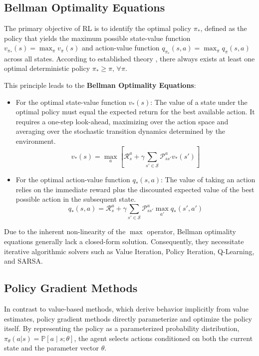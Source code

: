 \documentclass[a4paper]{scrartcl}
\begin{document}
\subsection{Bellman Optimality Equations}
The primary objective of RL is to identify the optimal policy $\pi_*$, defined as the policy that yields the maximum possible state-value function $v_{\pi_*}(s) = \max_\pi v_\pi(s)$ and action-value function $q_{\pi_*}(s,a) = \max_\pi q_\pi(s,a)$ across all states. According to established theory \cite{SuttonBarto2018}, there always exists at least one optimal deterministic policy $\pi_* \geq \pi, \, \forall \pi$.

This principle leads to the \textbf{Bellman Optimality Equations}:
\begin{itemize}
    \item For the optimal state-value function $v_*(s)$: The value of a state under the optimal policy must equal the expected return for the best available action. It requires a one-step look-ahead, maximizing over the action space and averaging over the stochastic transition dynamics determined by the environment.
    \begin{equation}
    v_*(s) = \max_{a} \left[ \mathcal{R}_s^a + \gamma \sum_{s' \in \mathcal{S}} \mathcal{P}_{ss'}^a v_*(s') \right]
    \end{equation}
    
    \item For the optimal action-value function $q_*(s,a)$: The value of taking an action relies on the immediate reward plus the discounted expected value of the best possible action in the subsequent state.
    \begin{equation}
    q_*(s,a) = \mathcal{R}_s^a + \gamma \sum_{s' \in \mathcal{S}} \mathcal{P}_{ss'}^a \max_{a'} q_*(s',a')
    \end{equation}
\end{itemize}
Due to the inherent non-linearity of the $\max$ operator, Bellman optimality equations generally lack a closed-form solution. Consequently, they necessitate iterative algorithmic solvers such as Value Iteration, Policy Iteration, Q-Learning, and SARSA.

\subsection{Policy Gradient Methods}
In contrast to value-based methods, which derive behavior implicitly from value estimates, policy gradient methods directly parameterize and optimize the policy itself. By representing the policy as a parameterized probability distribution, $\pi_\theta(a|s) = \mathbb{P}[a \mid s; \theta]$, the agent selects actions conditioned on both the current state and the parameter vector $\theta$.
\end{document}
